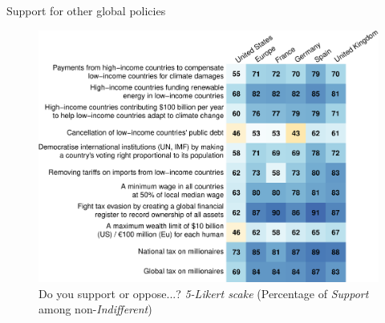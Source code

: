 \documentclass[aspectratio=169,xcolor=dvipsnames, 11pt,mathserif]{beamer}
\begin{document}
\begin{framefont}{\small}
\begin{frame}{Support for other global policies\label{}}
	\vspace{-.3cm}
    \begin{figure}
        \centering 
        \caption{Do you support or oppose...? \textit{5-Likert scake} (Percentage of \textit{Support} among non-\textit{Indifferent})}
        \vspace{-.2cm}
        \includegraphics[height=.9\textheight]{../figures/country_comparison/support_likert_share.pdf} 
    \end{figure}
\end{frame}


\end{framefont}
\end{document}
